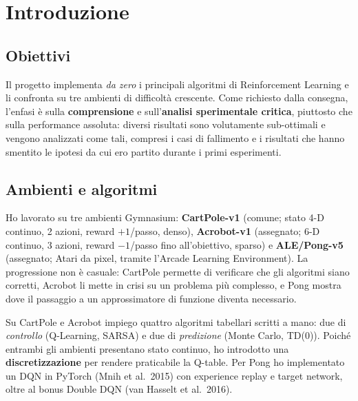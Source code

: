 \section{Introduzione}
\label{sec:introduction}

\subsection{Obiettivi}
Il progetto implementa \emph{da zero} i principali algoritmi di Reinforcement Learning e
li confronta su tre ambienti di difficolt\`a crescente. Come richiesto dalla consegna,
l'enfasi \`e sulla \textbf{comprensione} e sull'\textbf{analisi sperimentale critica},
piuttosto che sulla performance assoluta: diversi risultati sono volutamente sub-ottimali e
vengono analizzati come tali, compresi i casi di fallimento e i risultati che hanno
smentito le ipotesi da cui ero partito durante i primi esperimenti.

\subsection{Ambienti e algoritmi}
Ho lavorato su tre ambienti Gymnasium:
\textbf{CartPole-v1} (comune; stato 4-D continuo, 2 azioni, reward $+1$/passo, denso),
\textbf{Acrobot-v1} (assegnato; 6-D continuo, 3 azioni, reward $-1$/passo fino
all'obiettivo, sparso) e \textbf{ALE/Pong-v5} (assegnato; Atari da
pixel, tramite l'Arcade Learning Environment). La progressione non \`e casuale: CartPole
permette di verificare che gli algoritmi siano corretti, Acrobot li mette in crisi
su un problema pi\`u complesso, e Pong mostra dove il passaggio a un approssimatore di
funzione diventa necessario.

Su CartPole e Acrobot impiego quattro algoritmi tabellari scritti a mano: due di
\emph{controllo} (Q\hbox{-}Learning, SARSA) e due di \emph{predizione} (Monte Carlo,
TD(0)). Poich\'e entrambi gli ambienti presentano stato continuo, ho introdotto una
\textbf{discretizzazione} per rendere praticabile la Q-table. Per Pong ho implementato
un DQN in PyTorch (Mnih et al.\ 2015) con experience replay e target network, oltre al
bonus Double DQN (van Hasselt et al.\ 2016).
